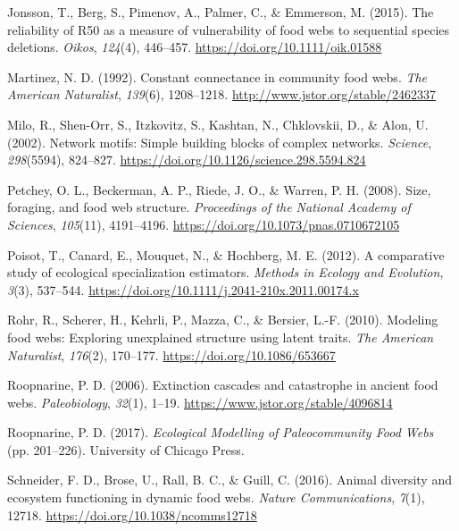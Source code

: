\documentclass[
]{article}
\newlength{\cslhangindent}
\newenvironment{CSLReferences}[2] %
 {\begin{list}{}{%
  \setlength{\itemindent}{0pt}
  \setlength{\leftmargin}{0pt}
  \setlength{\parsep}{0pt}
  \ifodd #1
   \setlength{\leftmargin}{\cslhangindent}
   \setlength{\itemindent}{-1\cslhangindent}
  \fi
  \setlength{\itemsep}{#2\baselineskip}}}
 {\end{list}}
\begin{document}
\begin{CSLReferences}{1}{0}
Jonsson, T., Berg, S., Pimenov, A., Palmer, C., \& Emmerson, M. (2015).
The reliability of R50 as a measure of vulnerability of food webs to
sequential species deletions. \emph{Oikos}, \emph{124}(4), 446--457.
\url{https://doi.org/10.1111/oik.01588}

Martinez, N. D. (1992). Constant connectance in community food webs.
\emph{The American Naturalist}, \emph{139}(6), 1208--1218.
\url{http://www.jstor.org/stable/2462337}

Milo, R., Shen-Orr, S., Itzkovitz, S., Kashtan, N., Chklovskii, D., \&
Alon, U. (2002). Network motifs: Simple building blocks of complex
networks. \emph{Science}, \emph{298}(5594), 824--827.
\url{https://doi.org/10.1126/science.298.5594.824}

Petchey, O. L., Beckerman, A. P., Riede, J. O., \& Warren, P. H. (2008).
Size, foraging, and food web structure. \emph{Proceedings of the
National Academy of Sciences}, \emph{105}(11), 4191--4196.
\url{https://doi.org/10.1073/pnas.0710672105}

Poisot, T., Canard, E., Mouquet, N., \& Hochberg, M. E. (2012). A
comparative study of ecological specialization estimators. \emph{Methods
in Ecology and Evolution}, \emph{3}(3), 537--544.
\url{https://doi.org/10.1111/j.2041-210x.2011.00174.x}

Rohr, R., Scherer, H., Kehrli, P., Mazza, C., \& Bersier, L.-F. (2010).
Modeling food webs: Exploring unexplained structure using latent traits.
\emph{The American Naturalist}, \emph{176}(2), 170--177.
\url{https://doi.org/10.1086/653667}

Roopnarine, P. D. (2006). Extinction cascades and catastrophe in ancient
food webs. \emph{Paleobiology}, \emph{32}(1), 1--19.
\url{https://www.jstor.org/stable/4096814}

Roopnarine, P. D. (2017). \emph{Ecological Modelling of Paleocommunity
Food Webs} (pp. 201--226). University of Chicago Press.

Schneider, F. D., Brose, U., Rall, B. C., \& Guill, C. (2016). Animal
diversity and ecosystem functioning in dynamic food webs. \emph{Nature
Communications}, \emph{7}(1), 12718.
\url{https://doi.org/10.1038/ncomms12718}


\end{CSLReferences}
\end{document}
